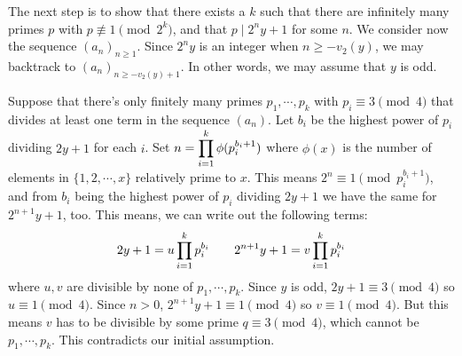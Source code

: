 \documentclass[11pt,a4paper]{article}
\begin{document}
\begin{enumerate}
	The next step is to show that there exists a $k$ such that there are infinitely many primes $p$ with $p\not\equiv 1\pmod{2^k}$, and that $p\mid 2^ny+1$ for some $n$. We consider now the sequence $(a_n)_{n\ge 1}$. Since $2^ny$ is an integer when $n\ge -v_2(y)$, we may backtrack to $(a_n)_{n\ge -v_2(y)+1}$. In other words, we may assume that $y$ is odd. 
	
	Suppose that there's only finitely many primes $p_1, \cdots , p_k$ with $p_i\equiv 3\pmod{4}$ that divides at least one term in the sequence $(a_n)$. Let $b_i$ be the highest power of $p_i$ dividing $2y+1$ for each $i$. Set $n=\displaystyle\prod_{i=1}^k \phi(p_i^{b_i+1})$ where $\phi(x)$ is the number of elements in $\{1, 2, \cdots , x\}$ relatively prime to $x$. 
	This means $2^n\equiv 1\pmod{p_i^{b_i+1}}$, and from $b_i$ being the highest power of $p_i$ dividing $2y+1$ we have the same for $2^{n+1}y+1$, too. 
	This means, we can write out the following terms: 
	\[
	2y+1 = u\displaystyle\prod_{i=1}^k p_i^{b_i}\qquad 2^{n+1}y+1 = v\displaystyle\prod_{i=1}^k p_i^{b_i}
	\]
	where $u, v$ are divisible by none of $p_1, \cdots, p_k$. Since $y$ is odd, $2y+1\equiv 3\pmod{4}$ so $u\equiv 1\pmod{4}$. 
	Since $n>0$, $2^{n+1}y+1\equiv 1\pmod{4}$ so $v\equiv 1\pmod{4}$. 
	But this means $v$ has to be divisible by some prime $q\equiv 3\pmod{4}$, which cannot be $p_1, \cdots, p_k$. This contradicts our initial assumption. 
	
\end{enumerate}
\end{document}
